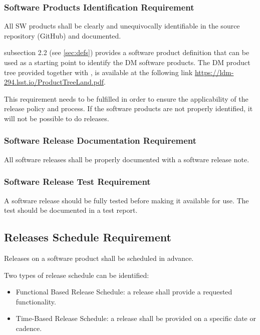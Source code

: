 \subsubsection{Software Products Identification Requirement} \label{sec:swid}

All \gls{SW} products shall be clearly and unequivocally identifiable in the source repository (GitHub) and documented.

 subsection 2.2 (see \ref{sec:defs}) provides a software product definition that can be used as a starting point to identify the DM software products.
The DM product tree provided together with , is available at the following link \url{https://ldm-294.lsst.io/ProductTreeLand.pdf}.

This requirement needs to be fulfilled in order to ensure the applicability of the release policy and process.
If the software products are not properly identified, it will not be possible to do releases.


\subsubsection{Software Release Documentation Requirement} \label{sec:reqdoc}

All software releases shall be properly documented with a software release note.


\subsubsection{Software Release Test Requirement} \label{sec:test}

A software release should be fully tested before making it available for use.
The test should be documented in a test report.


\subsection{Releases Schedule Requirement} \label{sec:milestone}

Releases on a software product shall be scheduled in advance.

Two types of release schedule can be identified:

\begin{itemize}
\item Functional Based Release Schedule: a release shall provide a requested functionality.
\item Time-Based Release Schedule: a release shall be provided on a specific date or cadence.
\end{itemize}

